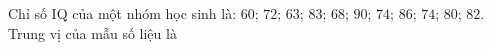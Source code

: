 \begin{ex}
Chỉ số IQ của một nhóm học sinh là: $60$; $72$; $63$; $83$; $68$; $90$; $74$; $86$; $74$; $80$; $82$. Trung vị của mẫu số liệu là
\end{ex}
